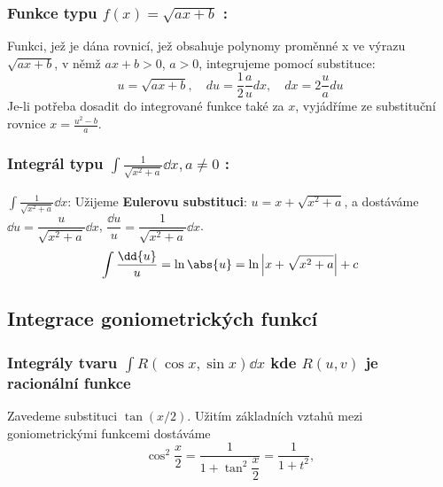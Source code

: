     \subsubsection*{Funkce typu $\boxed{f(x)=\sqrt{ax+b}}$ :}
      Funkci, jež je dána rovnicí, jež obsahuje polynomy proměnné x  ve výrazu $\sqrt{ax+b}$,
      v němž $ax+b>0$, $a>0$, integrujeme pomocí substituce:
      \begin{equation}\label{ma:eq_sub_fce1}
          u=\sqrt{ax+b},\quad du=\frac{1}{2}\frac{a}{u}dx,\quad dx=2\frac{u}{a}du
      \end{equation}
      Je-li potřeba dosadit do integrované funkce také za \(x\), vyjádříme ze substituční
      rovnice $x=\frac{u^2-b}{a}$.
    \subsubsection*{Integrál typu $\boxed{\int\frac{1}{\sqrt{x^2+a}}\dd{x}}, a\neq0$ :}
      \(\int\frac{1}{\sqrt{x^2+a}}\dd{x}\):\vskip0.5mm
      Užijeme \textbf{Eulerovu substituci}: \(u=x+\sqrt{x^2+a}\), a dostáváme
      \(\dd{u}=\dfrac{u}{\sqrt{x^2+a}}\dd{x}\), \(\dfrac{\dd{u}}{u}=\dfrac{1}{\sqrt{x^2+a}}\dd{x}\).
      \begin{equation}
        \int{\frac{\dd{u}}{u}}=\ln\abs{u} =\ln\left\lvert x+\sqrt{x^2+a}\right\rvert+c
      \end{equation}
  \newpage
  \subsection{Integrace goniometrických funkcí}
    \subsubsection{Integrály tvaru \(\int R(\cos x, \sin x)\dd{x}\) kde \(R(u, v)\) je racionální
    funkce}
      Zavedeme substituci \(\tan(x/2)\). Užitím základních vztahů mezi goniometrickými funkcemi
      dostáváme 
      \begin{equation}\label{mai:eq164}
        \cos^2\dfrac{x}{2} = \dfrac{1}{1+ \tan^2\dfrac{x}{2}} = \dfrac{1}{1+t^2},
      \end{equation}
